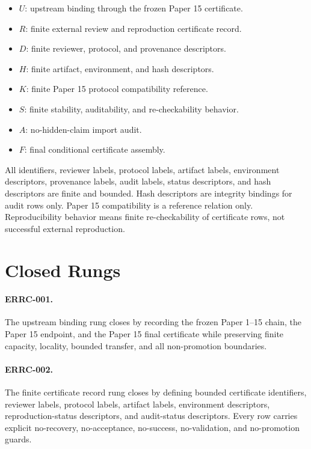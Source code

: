 \documentclass{article}
\begin{document}
\begin{itemize}
\item \(U\): upstream binding through the frozen Paper 15 certificate.
\item \(R\): finite external review and reproduction certificate record.
\item \(D\): finite reviewer, protocol, and provenance descriptors.
\item \(H\): finite artifact, environment, and hash descriptors.
\item \(K\): finite Paper 15 protocol compatibility reference.
\item \(S\): finite stability, auditability, and re-checkability behavior.
\item \(A\): no-hidden-claim import audit.
\item \(F\): final conditional certificate assembly.
\end{itemize}

All identifiers, reviewer labels, protocol labels, artifact labels,
environment descriptors, provenance labels, audit labels, status descriptors,
and hash descriptors are finite and bounded. Hash descriptors are integrity
bindings for audit rows only. Paper 15 compatibility is a reference relation
only. Reproducibility behavior means finite re-checkability of certificate
rows, not successful external reproduction.

\section{Closed Rungs}

\paragraph{ERRC-001.}
The upstream binding rung closes by recording the frozen Paper 1--15 chain,
the Paper 15 endpoint, and the Paper 15 final certificate while preserving
finite capacity, locality, bounded transfer, and all non-promotion boundaries.

\paragraph{ERRC-002.}
The finite certificate record rung closes by defining bounded certificate
identifiers, reviewer labels, protocol labels, artifact labels, environment
descriptors, reproduction-status descriptors, and audit-status descriptors.
Every row carries explicit no-recovery, no-acceptance, no-success,
no-validation, and no-promotion guards.
\end{document}
